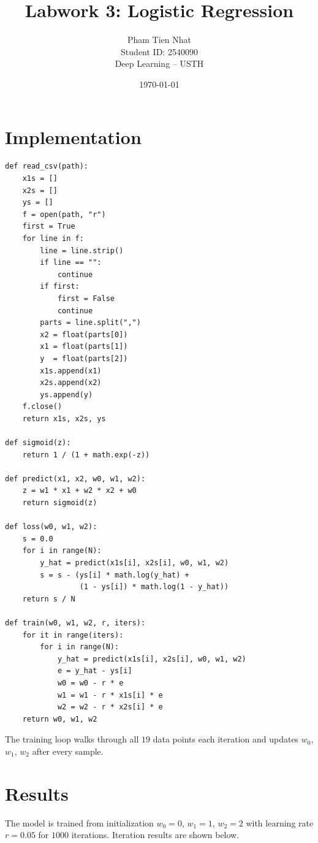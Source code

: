 \documentclass[11pt,a4paper]{article}
\title{Labwork 3: Logistic Regression}
\author{Pham Tien Nhat \\ Student ID: 2540090 \\ Deep Learning -- USTH}
\date{\today}
\begin{document}
\maketitle


\section{Implementation}


\begin{verbatim}
def read_csv(path):
    x1s = []
    x2s = []
    ys = []
    f = open(path, "r")
    first = True
    for line in f:
        line = line.strip()
        if line == "":
            continue
        if first:
            first = False
            continue
        parts = line.split(",")
        x2 = float(parts[0])
        x1 = float(parts[1])
        y  = float(parts[2])
        x1s.append(x1)
        x2s.append(x2)
        ys.append(y)
    f.close()
    return x1s, x2s, ys

def sigmoid(z):
    return 1 / (1 + math.exp(-z))

def predict(x1, x2, w0, w1, w2):
    z = w1 * x1 + w2 * x2 + w0
    return sigmoid(z)

def loss(w0, w1, w2):
    s = 0.0
    for i in range(N):
        y_hat = predict(x1s[i], x2s[i], w0, w1, w2)
        s = s - (ys[i] * math.log(y_hat) +
                 (1 - ys[i]) * math.log(1 - y_hat))
    return s / N

def train(w0, w1, w2, r, iters):
    for it in range(iters):
        for i in range(N):
            y_hat = predict(x1s[i], x2s[i], w0, w1, w2)
            e = y_hat - ys[i]
            w0 = w0 - r * e
            w1 = w1 - r * x1s[i] * e
            w2 = w2 - r * x2s[i] * e
    return w0, w1, w2
\end{verbatim}

The training loop walks through all $19$ data points each iteration and
updates $w_0$, $w_1$, $w_2$ after every sample.

\section{Results}

The model is trained from initialization $w_0=0$, $w_1=1$, $w_2=2$ with
learning rate $r = 0.05$ for $1000$ iterations. Iteration results are
shown below.
\end{document}

